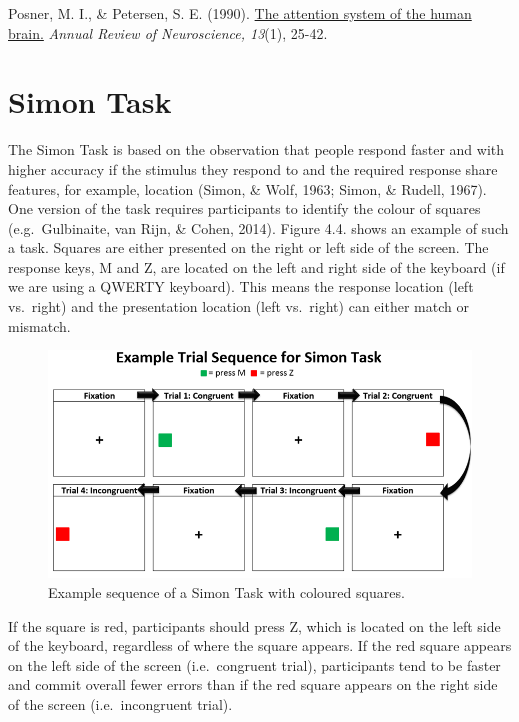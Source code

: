 \documentclass[
]{book}
\begin{document}
Posner, M. I., \& Petersen, S. E. (1990). \href{https://apps.dtic.mil/dtic/tr/fulltext/u2/a206157.pdf}{The attention system of the human brain.} \emph{Annual Review of Neuroscience, 13}(1), 25-42.

\hypertarget{simon-task}{%
\section{Simon Task}\label{simon-task}}

The Simon Task is based on the observation that people respond faster and with higher accuracy if the stimulus they respond to and the required response share features, for example, location (Simon, \& Wolf, 1963; Simon, \& Rudell, 1967). One version of the task requires participants to identify the colour of squares (e.g.~Gulbinaite, van Rijn, \& Cohen, 2014). Figure 4.4. shows an example of such a task. Squares are either presented on the right or left side of the screen. The response keys, M and Z, are located on the left and right side of the keyboard (if we are using a QWERTY keyboard). This means the response location (left vs.~right) and the presentation location (left vs.~right) can either match or mismatch.

\begin{figure}

{\centering \includegraphics[width=0.8\linewidth]{images/SimonTaskExample} 

}

\caption{Example sequence of a Simon Task with coloured squares.}\label{fig:Figure3-4}
\end{figure}

If the square is red, participants should press Z, which is located on the left side of the keyboard, regardless of where the square appears. If the red square appears on the left side of the screen (i.e.~congruent trial), participants tend to be faster and commit overall fewer errors than if the red square appears on the right side of the screen (i.e.~incongruent trial).
\end{document}
